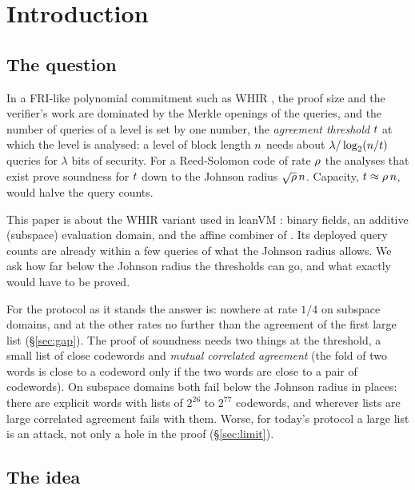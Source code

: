 \section{Introduction}\label{sec:intro}

\subsection{The question}

In a FRI-like polynomial commitment such as WHIR \cite{ACFY25}, the proof size and the verifier's work are dominated by the Merkle openings of the queries, and the number of queries of a level is set by one number, the \emph{agreement threshold} $t$ at which the level is analysed: a level of block length $n$ needs about $\lambda/\log_2(n/t)$ queries for $\lambda$ bits of security. For a Reed-Solomon code of rate $\rho$ the analyses that exist prove soundness for $t$ down to the Johnson radius $\sqrt{\rho}\,n$. Capacity, $t\approx\rho\,n$, would halve the query counts.

This paper is about the WHIR variant used in leanVM \cite{leanvm}: binary fields, an additive (subspace) evaluation domain, and the affine combiner of \cite{CWYZ26}. Its deployed query counts are already within a few queries of what the Johnson radius allows. We ask how far below the Johnson radius the thresholds can go, and what exactly would have to be proved.

For the protocol as it stands the answer is: nowhere at rate $1/4$ on subspace domains, and at the other rates no further than the agreement of the first large list (\S\ref{sec:gap}). The proof of soundness needs two things at the threshold, a small list of close codewords and \emph{mutual correlated agreement} (the fold of two words is close to a codeword only if the two words are close to a pair of codewords). On subspace domains both fail below the Johnson radius in places: there are explicit words with lists of $2^{26}$ to $2^{77}$ codewords, and wherever lists are large correlated agreement fails with them. Worse, for today's protocol a large list is an attack, not only a hole in the proof (\S\ref{sec:limit}).

\subsection{The idea}

